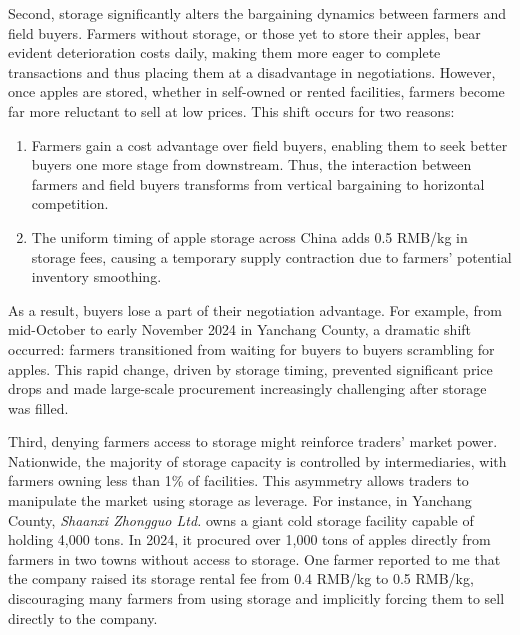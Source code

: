 Second, storage significantly alters the bargaining dynamics between farmers and field buyers. Farmers without storage, or those yet to store their apples, bear evident deterioration costs daily, making them more eager to complete transactions and thus placing them at a disadvantage in negotiations. However, once apples are stored, whether in self-owned or rented facilities, farmers become far more reluctant to sell at low prices. This shift occurs for two reasons: 
\begin{enumerate}
    \item Farmers gain a cost advantage over field buyers, enabling them to seek better buyers one more stage from downstream. Thus, the interaction between farmers and field buyers transforms from vertical bargaining to horizontal competition.
    \item The uniform timing of apple storage across China adds 0.5 RMB/kg in storage fees, causing a temporary supply contraction due to farmers' potential inventory smoothing.
\end{enumerate}
As a result, buyers lose a part of their negotiation advantage. For example, from mid-October to early November 2024 in Yanchang County, a dramatic shift occurred: farmers transitioned from waiting for buyers to buyers scrambling for apples. This rapid change, driven by storage timing, prevented significant price drops and made large-scale procurement increasingly challenging after storage was filled.

Third, denying farmers access to storage might reinforce traders' market power. Nationwide, the majority of storage capacity is controlled by intermediaries, with farmers owning less than 1\% of facilities. This asymmetry allows traders to manipulate the market using storage as leverage. For instance, in Yanchang County, \textit{Shaanxi Zhongguo Ltd.} owns a giant cold storage facility capable of holding 4,000 tons. In 2024, it procured over 1,000 tons of apples directly from farmers in two towns without access to storage. One farmer reported to me that the company raised its storage rental fee from 0.4 RMB/kg to 0.5 RMB/kg, discouraging many farmers from using storage and implicitly forcing them to sell directly to the company.


